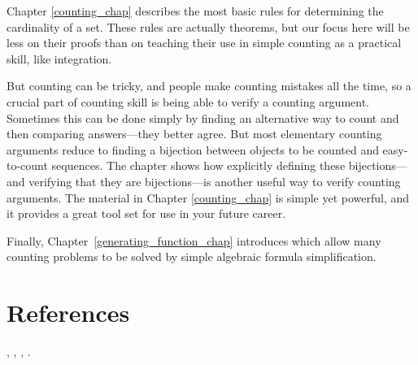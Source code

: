 \iffalse
In Chapter~\ref{chap:recurrences}, we show how to solve a variety of
recurrences that arise in computational problems.  These methods are
especially useful when you need to design or analyze recursive
programs.
\fi

Chapter \ref{counting_chap} describes the most basic rules for determining
the cardinality of a set.  These rules are actually theorems, but our
focus here will be less on their proofs than on teaching their use in
simple counting as a practical skill, like integration.

But counting can be tricky, and people make counting mistakes all the
time, so a crucial part of counting skill is being able to verify a
counting argument.  Sometimes this can be done simply by finding an
alternative way to count and then comparing answers---they better
agree.  But most elementary counting arguments reduce to finding a
bijection between objects to be counted and easy-to-count sequences.
The chapter shows how explicitly defining these bijections---and
verifying that they are bijections---is another useful way to verify
counting arguments.  The material in Chapter \ref{counting_chap} is
simple yet powerful, and it provides a great tool set for use in your
future career.

Finally, Chapter~\ref{generating_function_chap} introduces
 which allow many counting problems to be
solved by simple algebraic formula simplification.

\iffalse
We conclude in Chapter~\ref{cardinality_chap} with a brief digression
into the final frontier of counting---infinity.  We'll define what it
means for a set to be countable and show you some examples of sets
that are really big---bigger even than the set of real numbers.
\fi

\section{References}
 \cite{BenjaminQ2003},
 \cite{Bona2007},
 \cite{Flajolet2009},
 \cite{GrahamKP1994}
 \cite{Wilf1990}.
\endinput
